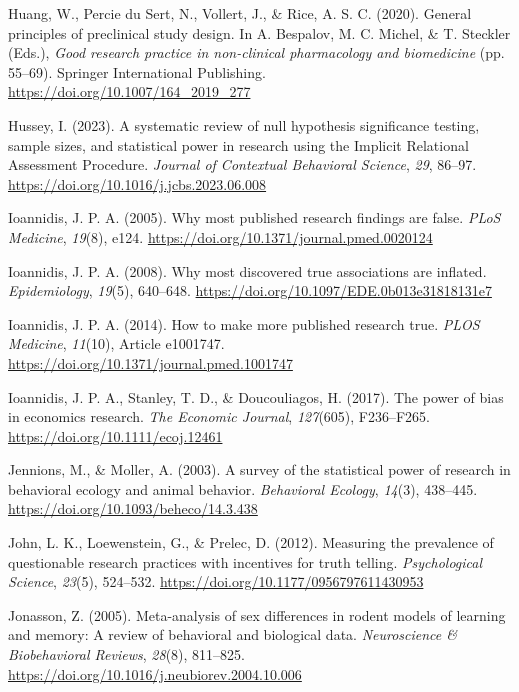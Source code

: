 \documentclass[authordate, meta, issue]{jote-new-article}
\begin{document}
	Huang, W., Percie du Sert, N., Vollert, J., \& Rice, A. S. C. (2020). General principles of preclinical study design. In A. Bespalov, M. C. Michel, \& T. Steckler (Eds.), \emph{Good research practice in non-clinical pharmacology and biomedicine} (pp. 55--69). Springer International Publishing. \url{https://doi.org/10.1007/164\_2019\_277}



	Hussey, I. (2023). A systematic review of null hypothesis significance testing, sample sizes, and statistical power in research using the Implicit Relational Assessment Procedure. \emph{Journal of Contextual Behavioral Science}, \emph{29}, 86--97. \url{https://doi.org/10.1016/j.jcbs.2023.06.008}



	Ioannidis, J. P. A. (2005). Why most published research findings are false. \emph{PLoS Medicine}, \emph{19}(8), e124. \url{https://doi.org/10.1371/journal.pmed.0020124}



	Ioannidis, J. P. A. (2008). Why most discovered true associations are inflated. \emph{Epidemiology}, \emph{19}(5), 640--648. \url{https://doi.org/10.1097/EDE.0b013e31818131e7}



	Ioannidis, J. P. A. (2014). How to make more published research true. \emph{PLOS Medicine}, \emph{11}(10), Article e1001747. \url{https://doi.org/10.1371/journal.pmed.1001747}



	Ioannidis, J. P. A., Stanley, T. D., \& Doucouliagos, H. (2017). The power of bias in economics research. \emph{The Economic Journal}, \emph{127}(605), F236--F265. \url{https://doi.org/10.1111/ecoj.12461}



	Jennions, M., \& Moller, A. (2003). A survey of the statistical power of research in behavioral ecology and animal behavior. \emph{Behavioral Ecology}, \emph{14}(3), 438--445. \url{https://doi.org/10.1093/beheco/14.3.438}



	John, L. K., Loewenstein, G., \& Prelec, D. (2012). Measuring the prevalence of questionable research practices with incentives for truth telling. \emph{Psychological Science}, \emph{23}(5), 524--532. \url{https://doi.org/10.1177/0956797611430953}



	Jonasson, Z. (2005). Meta-analysis of sex differences in rodent models of learning and memory: A review of behavioral and biological data. \emph{Neuroscience \& Biobehavioral Reviews}, \emph{28}(8), 811--825. \url{https://doi.org/10.1016/j.neubiorev.2004.10.006}
\end{document}

